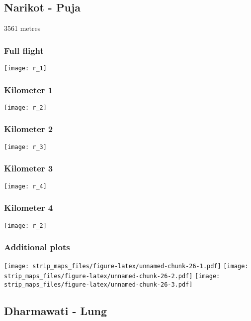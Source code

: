 \documentclass[]{article}
\begin{document}
\newpage

\subsection{Narikot - Puja}\label{narikot---puja}

3561 metres

\subsubsection{Full flight}\label{full-flight-17}

\texttt{[image: r\_1]}

\subsubsection{Kilometer 1}\label{kilometer-1-17}

\texttt{[image: r\_2]}

\subsubsection{Kilometer 2}\label{kilometer-2-17}

\texttt{[image: r\_3]}

\subsubsection{Kilometer 3}\label{kilometer-3-17}

\texttt{[image: r\_4]}

\subsubsection{Kilometer 4}\label{kilometer-4-16}

\texttt{[image: r\_2]}

\subsubsection{Additional plots}\label{additional-plots-17}

\texttt{[image: strip\_maps\_files/figure-latex/unnamed-chunk-26-1.pdf]}
\texttt{[image: strip\_maps\_files/figure-latex/unnamed-chunk-26-2.pdf]}
\texttt{[image: strip\_maps\_files/figure-latex/unnamed-chunk-26-3.pdf]}

\newpage

\subsection{Dharmawati - Lung}\label{dharmawati---lung}
\end{document}
